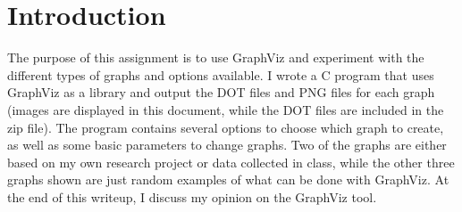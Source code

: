 \documentclass[11pt]{article}
\numberwithin{figure}{section}
\begin{document}
\maketitle
\section{Introduction}
The purpose of this assignment is to use GraphViz and experiment with the different types of graphs and options available. I wrote a C program that uses GraphViz as a library and output the DOT files and PNG files for each graph (images are displayed in this document, while the DOT files are included in the zip file).  The program contains several options to choose which graph to create, as well as some basic parameters to change graphs.  Two of the graphs are either based on my own research project or data collected in class, while the other three graphs shown are just random examples of what can be done with GraphViz.  At the end of this writeup, I discuss my opinion on the GraphViz tool.  
\end{document}
